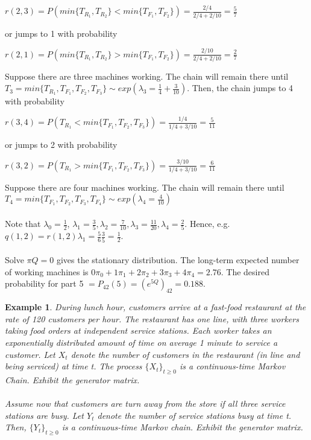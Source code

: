 \documentclass[12pt]{article}
\newtheorem{example}{Example}
\begin{document}
\begin{center}
    $r(2,3) = P(min\{T_{R_1}, T_{R_2}\} < min\{T_{F_1}, T_{F_2}\}) = \frac{2/4}{2/4 + 2/10} = \frac{5}{7}$
\end{center}
or jumps to 1 with probability
\begin{center}
    $r(2,1) = P(min\{T_{R_1}, T_{R_2}\} > min\{T_{F_1}, T_{F_2}\}) = \frac{2/10}{2/4 + 2/10} = \frac{2}{7}$
\end{center}

\noindent Suppose there are three machines working. The chain will remain there until $T_3 = min\{T_{R_1}, T_{F_1}, T_{F_2}, T_{F_3}\} \sim exp(\lambda_3 = \frac{1}{4} + \frac{3}{10})$. Then, the chain jumps to 4 with probability
\begin{center}
    $r(3,4) = P(T_{R_1} < min\{T_{F_1}, T_{F_2}, T_{F_3}\}) = \frac{1/4}{1/4 + 3/10} = \frac{5}{11}$
\end{center}
or jumps to 2 with probability
\begin{center}
    $r(3,2) = P(T_{R_1} > min\{T_{F_1}, T_{F_2}, T_{F_3}\}) = \frac{3/10}{1/4 + 3/10} = \frac{6}{11}$
\end{center}

\noindent Suppose there are four machines working. The chain will remain there until $T_4 = min\{T_{F_1}, T_{F_2}, T_{F_3}, T_{F_4}\} \sim exp(\lambda_4 = \frac{4}{10})$
\\
\\
Note that $\lambda_0 = \frac{1}{2}$, $\lambda_1 = \frac{3}{5}, \lambda_2 = \frac{7}{10}, \lambda_3 = \frac{11}{20}, \lambda_4 = \frac{2}{5}$. Hence, e.g. $q(1,2) = r(1,2) \lambda_1 = \frac{5}{6}\frac{3}{5} = \frac{1}{2}$.
\\
\\
Solve $\pi Q = 0$ gives the stationary distribution. The long-term expected number of working machines is $0\pi_0 + 1\pi_1 + 2\pi_2 + 3\pi_3 + 4\pi_4 = 2.76$. The desired probability for part 5 $= P_{42}(5) = (e^{5Q})_{42} = 0.188$.

\begin{example}
    During lunch hour, customers arrive at a fast-food restaurant at the rate of 120 customers per hour. The restaurant has one line, with three workers taking food orders at independent service stations. Each worker takes an exponentially distributed amount of time on average 1 minute to service a customer. Let $X_t$ denote the number of customers in the restaurant (in line and being serviced) at time t. The process $\{X_t\}_{t \geq 0}$ is a continuous-time Markov Chain. Exhibit the generator matrix.
    \\
    \\Assume now that customers are turn away from the store if all three service stations are busy. Let $Y_t$ denote the number of service stations busy at time t. Then, $\{Y_t\}_{t \geq 0}$ is a continuous-time Markov chain. Exhibit the generator matrix.
\end{example}
\end{document}
